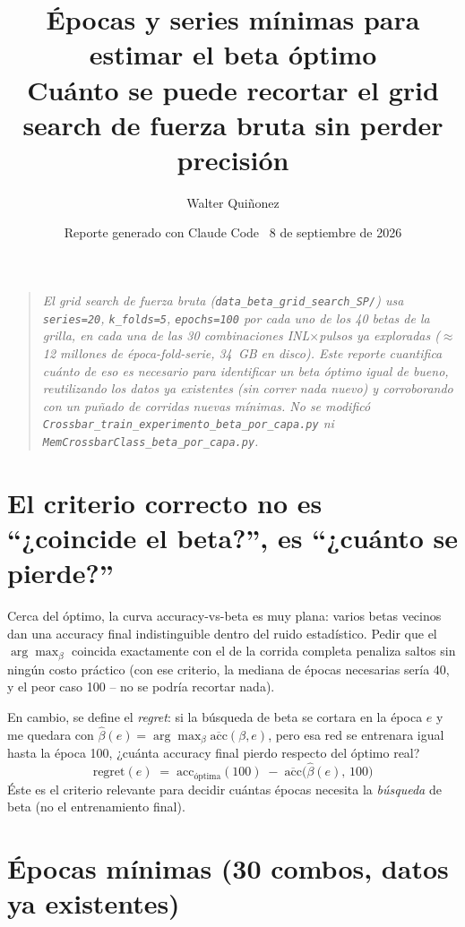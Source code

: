 \documentclass[11pt]{article}
\title{\textbf{Épocas y series mínimas para estimar el beta óptimo}\\
\large Cuánto se puede recortar el grid search de fuerza bruta sin perder precisión}
\author{Walter Quiñonez}
\date{Reporte generado con Claude Code \textperiodcentered\ 8 de septiembre de 2026}
\begin{document}
\maketitle

\begin{quote}\itshape
El grid search de fuerza bruta (\texttt{data\_beta\_grid\_search\_SP/}) usa
\texttt{series=20}, \texttt{k\_folds=5}, \texttt{epochs=100} por cada uno de los 40
betas de la grilla, en cada una de las 30 combinaciones INL$\times$pulsos ya exploradas
($\approx$12 millones de época-fold-serie, 34~GB en disco). Este reporte cuantifica
cuánto de eso es necesario para identificar un beta óptimo igual de bueno, reutilizando
los datos ya existentes (sin correr nada nuevo) y corroborando con un puñado de corridas
nuevas mínimas. No se modificó \texttt{Crossbar\_train\_experimento\_beta\_por\_capa.py}
ni \texttt{MemCrossbarClass\_beta\_por\_capa.py}.
\end{quote}

\tableofcontents

\section{El criterio correcto no es ``¿coincide el beta?'', es ``¿cuánto se pierde?''}

Cerca del óptimo, la curva accuracy-vs-beta es muy plana: varios betas vecinos dan una
accuracy final indistinguible dentro del ruido estadístico. Pedir que el
$\arg\max_\beta$ coincida exactamente con el de la corrida completa penaliza saltos sin
ningún costo práctico (con ese criterio, la mediana de épocas necesarias sería 40, y el
peor caso 100 -- no se podría recortar nada).

En cambio, se define el \emph{regret}: si la búsqueda de beta se cortara en la época
$e$ y me quedara con $\hat\beta(e)=\arg\max_\beta \overline{\text{acc}}(\beta,e)$, pero
esa red se entrenara igual hasta la época 100, ¿cuánta accuracy final pierdo respecto del
óptimo real?
\[
\text{regret}(e) \;=\; \text{acc}_{\text{óptima}}(100) \;-\; \overline{\text{acc}}\big(\hat\beta(e),\,100\big)
\]
Éste es el criterio relevante para decidir cuántas épocas necesita la \emph{búsqueda} de
beta (no el entrenamiento final).

\section{Épocas mínimas (30 combos, datos ya existentes)}
\end{document}
